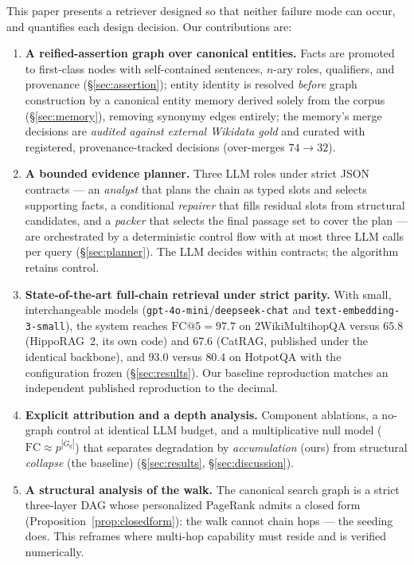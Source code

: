 \documentclass[11pt,a4paper]{article}
\newcommand{\hippo}{HippoRAG~2}
\begin{document}
This paper presents a retriever designed so that neither failure mode can
occur, and quantifies each design decision. Our contributions are:

\begin{enumerate}[leftmargin=1.6em,itemsep=2pt]
\item \textbf{A reified-assertion graph over canonical entities.} Facts are
  promoted to first-class nodes with self-contained sentences, $n$-ary roles,
  qualifiers, and provenance (\S\ref{sec:assertion}); entity identity is
  resolved \emph{before} graph construction by a canonical entity memory
  derived solely from the corpus (\S\ref{sec:memory}), removing synonymy
  edges entirely; the memory's merge decisions are \emph{audited against
  external Wikidata gold} and curated with registered, provenance-tracked
  decisions (over-merges $74\to32$).
\item \textbf{A bounded evidence planner.} Three LLM roles under strict JSON
  contracts --- an \emph{analyst} that plans the chain as typed slots and
  selects supporting facts, a conditional \emph{repairer} that fills residual
  slots from structural candidates, and a \emph{packer} that selects the
  final passage set to cover the plan --- are orchestrated by a deterministic
  control flow with at most three LLM calls per query
  (\S\ref{sec:planner}). The LLM decides within contracts; the algorithm
  retains control.
\item \textbf{State-of-the-art full-chain retrieval under strict parity.}
  With small, interchangeable models
  (\texttt{gpt-4o-mini}/\texttt{deepseek-chat} and
  \texttt{text-embedding-3-small}), the system reaches
  $\mathrm{FC@}5=97.7$ on 2WikiMultihopQA versus $65.8$ (\hippo{}, its own
  code) and $67.6$ (CatRAG, published under the identical backbone), and
  $93.0$ versus $80.4$ on HotpotQA with the configuration frozen
  (\S\ref{sec:results}). Our baseline reproduction matches an independent
  published reproduction to the decimal.
\item \textbf{Explicit attribution and a depth analysis.} Component
  ablations, a no-graph control at identical LLM budget, and a multiplicative
  null model ($\mathrm{FC}\approx p^{|G_q|}$) that separates degradation by
  \emph{accumulation} (ours) from structural \emph{collapse} (the baseline)
  (\S\ref{sec:results}, \S\ref{sec:discussion}).
\item \textbf{A structural analysis of the walk.} The canonical search
  graph is a strict three-layer DAG whose personalized PageRank admits a
  closed form (Proposition~\ref{prop:closedform}): the walk cannot chain
  hops --- the seeding does. This reframes where multi-hop capability must
  reside and is verified numerically.
\end{enumerate}
\end{document}
